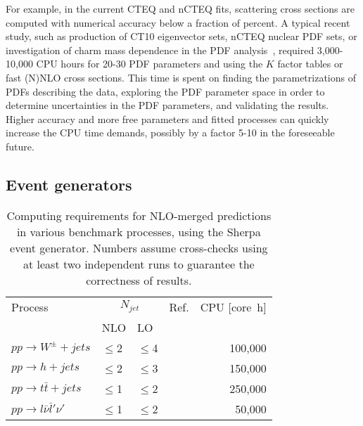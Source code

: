 \documentclass[12pt]{article}
\begin{document}
For example, in the current CTEQ and nCTEQ fits, scattering cross
sections are computed with numerical accuracy below a fraction of
percent. A typical recent study, such as production of
CT10 eigenvector sets, nCTEQ nuclear PDF sets, or investigation 
of charm mass dependence in the PDF analysis~\cite{Gao:2013wwa,
 Gao:2013xoa,Schienbein:2009kk}, required  3,000-10,000 CPU hours 
for 20-30 PDF parameters and using the $K$ factor
tables or fast (N)NLO cross sections. This time is spent on finding
the parametrizations of PDFs describing the data,
exploring the PDF parameter space in order to determine uncertainties
in the PDF parameters, and validating the results. Higher accuracy and
more free parameters and fitted processes can quickly increase the
CPU time demands, possibly by a factor 5-10 in the foreseeable future.

\subsection{Event generators}

\begin{table}
  \centering
  \begin{tabular}{llllr}
    \hline
    Process & \multicolumn{2}{c}{$N_{jet}$} & Ref. & CPU [core~h] \\
    & NLO & LO & & \\
    \hline\hline
    $pp\to W^\pm+jets$ & $\le$2 & $\le$4 & \cite{Hoeche:2012yf} & 100,000 \\
    $pp\to h+jets$ & $\le$2 & $\le$3 & \cite{Hoeche:2013xxx} & 150,000 \\
    $pp\to t\bar{t}+jets$ & $\le$1 & $\le$2 & \cite{Hoeche:2013mua} & 250,000 \\
    $pp\to l\bar{\nu}\bar{l}'\nu'$ & $\le$1 & $\le$2 & \cite{Cascioli:2013xxx} & 50,000 \\
    \hline
  \end{tabular}
  \caption{Computing requirements for NLO-merged predictions in
    various benchmark processes, using the Sherpa event generator.
    Numbers assume cross-checks using at least two independent runs
    to guarantee the correctness of results.
    \label{tab:nlo_merging}}
\end{table}
\end{document}
